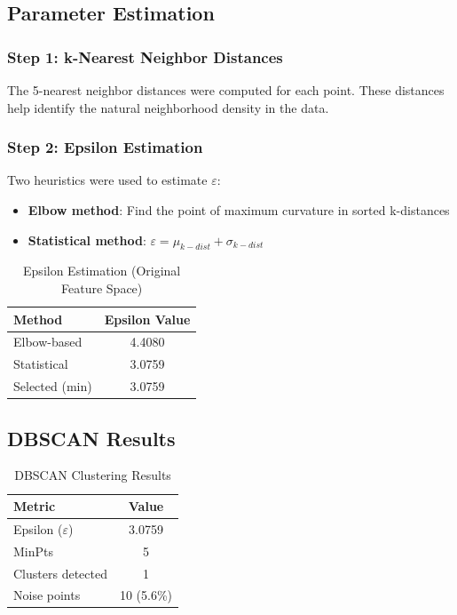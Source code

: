 \documentclass[12pt,a4paper]{article}
\begin{document}
\subsection{Parameter Estimation}

\subsubsection{Step 1: k-Nearest Neighbor Distances}

The 5-nearest neighbor distances were computed for each point. These distances help identify the natural neighborhood density in the data.

\subsubsection{Step 2: Epsilon Estimation}

Two heuristics were used to estimate $\varepsilon$:
\begin{itemize}
    \item \textbf{Elbow method}: Find the point of maximum curvature in sorted k-distances
    \item \textbf{Statistical method}: $\varepsilon = \mu_{k-dist} + \sigma_{k-dist}$
\end{itemize}

\begin{table}[H]
\centering
\caption{Epsilon Estimation (Original Feature Space)}
\begin{tabular}{lc}
\toprule
\textbf{Method} & \textbf{Epsilon Value} \\
\midrule
Elbow-based & 4.4080 \\
Statistical & 3.0759 \\
Selected (min) & 3.0759 \\
\bottomrule
\end{tabular}
\end{table}

\subsection{DBSCAN Results}

\begin{table}[H]
\centering
\caption{DBSCAN Clustering Results}
\begin{tabular}{lc}
\toprule
\textbf{Metric} & \textbf{Value} \\
\midrule
Epsilon ($\varepsilon$) & 3.0759 \\
MinPts & 5 \\
Clusters detected & 1 \\
Noise points & 10 (5.6\%) \\
\bottomrule
\end{tabular}
\end{table}
\end{document}
